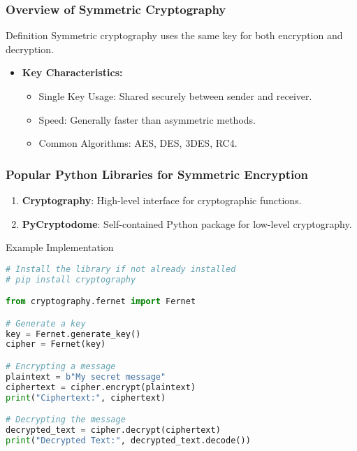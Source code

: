 \documentclass{beamer}
\begin{document}
\begin{frame}[fragile]
    \frametitle{Overview of Symmetric Cryptography}
    \begin{block}{Definition}
        Symmetric cryptography uses the same key for both encryption and decryption.
    \end{block}
    
    \begin{itemize}
        \item \textbf{Key Characteristics:}
        \begin{itemize}
            \item Single Key Usage: Shared securely between sender and receiver.
            \item Speed: Generally faster than asymmetric methods.
            \item Common Algorithms: AES, DES, 3DES, RC4.
        \end{itemize}
    \end{itemize}
\end{frame}

\begin{frame}[fragile]
    \frametitle{Popular Python Libraries for Symmetric Encryption}
    \begin{enumerate}
        \item \textbf{Cryptography}: High-level interface for cryptographic functions.
        \item \textbf{PyCryptodome}: Self-contained Python package for low-level cryptography.
    \end{enumerate}
    
    \begin{block}{Example Implementation}
        \begin{lstlisting}[language=Python]
# Install the library if not already installed
# pip install cryptography

from cryptography.fernet import Fernet

# Generate a key
key = Fernet.generate_key()
cipher = Fernet(key)

# Encrypting a message
plaintext = b"My secret message"
ciphertext = cipher.encrypt(plaintext)
print("Ciphertext:", ciphertext)

# Decrypting the message
decrypted_text = cipher.decrypt(ciphertext)
print("Decrypted Text:", decrypted_text.decode())
        \end{lstlisting}
    \end{block}
\end{frame}
\end{document}
